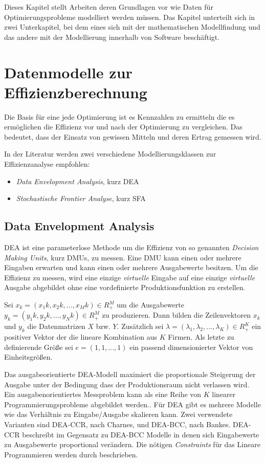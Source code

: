 Dieses Kapitel stellt Arbeiten deren Grundlagen vor wie Daten für Optimierungsprobleme modelliert werden müssen. Das Kapitel unterteilt sich in zwei Unterkapitel, bei dem eines sich mit der mathematischen Modellfindung und das andere mit der Modellierung innerhalb von Software beschäftigt.

\section{Datenmodelle zur Effizienzberechnung}
Die Basis für eine jede Optimierung ist es Kennzahlen zu ermitteln die es ermöglichen die Effizienz vor und nach der Optimierung zu vergleichen. Das bedeutet, dass der Einsatz von gewissen Mitteln und deren Ertrag gemessen wird. 

In der Literatur werden zwei verschiedene Modellierungsklassen zur Effizienzanalyse empfohlen:\cite{jour:Curtiss2012}\cite{conf:Jian2013}
\begin{itemize}
	\item \textit{Data Envelopment Analysis}, kurz DEA
	\item \textit{Stochastische Frontier Analyse}, kurz SFA
\end{itemize}

\subsection{Data Envelopment Analysis}

DEA ist eine parameterlose Methode um die Effizienz von so genannten \textit{Decision Making Units}, kurz DMUs, zu messen. Eine DMU kann einen oder mehrere Eingaben erwarten und kann einen oder mehrere Ausgabewerte besitzen. Um die Effizienz zu messen, wird eine einzige \textit{virtuelle} Eingabe auf eine einzige \textit{virtuelle} Ausgabe abgebildet ohne eine vordefinierte Produktionsfunktion zu erstellen.\cite{jour:Cullinane2006}

Sei $x_k=(x_1k,x_2k,...,x_Mk) \in R^{M}_+$ um die Ausgabewerte $y_k=(y_1k,y_2k,...,y_Nk) \in R^{M}_+$ zu produzieren. Dann bilden die Zeilenvektoren $x_k$ und $y_k$ die Datenmatrizen $X$ bzw. $Y$. Zusätzlich sei $\lambda = (\lambda_1,\lambda_2,...,\lambda_K) \in R^{K}_+$ ein positiver Vektor der die lineare Kombination aus $K$ Firmen. Als letzte zu definierende Größe sei $e = (1,1,...,1)$ ein passend dimensionierter Vektor von Einheitsgrößen.\cite{jour:Cullinane2006}

Das ausgabeorientierte DEA-Modell maximiert die proportionale Steigerung der Ausgabe unter der Bedingung dass der Produktionsraum nicht verlassen wird. Ein ausgabenorientiertes Messproblem kann als eine Reihe von $K$ linearer Programmierungsprobleme abgebildet werden.\cite{jour:Cullinane2006}. Für DEA gibt es mehrere Modelle wie das Verhältnis zu Eingabe/Ausgabe skalieren kann. Zwei verwendete Varianten sind DEA-CCR, nach Charnes, und DEA-BCC, nach Bankes. DEA-CCR beschreibt im Gegensatz zu DEA-BCC Modelle in denen sich Eingabewerte zu Ausgabewerte proportional verändern. Die nötigen \textit{Constraints} für das Lineare Programmieren werden durch beschrieben.

